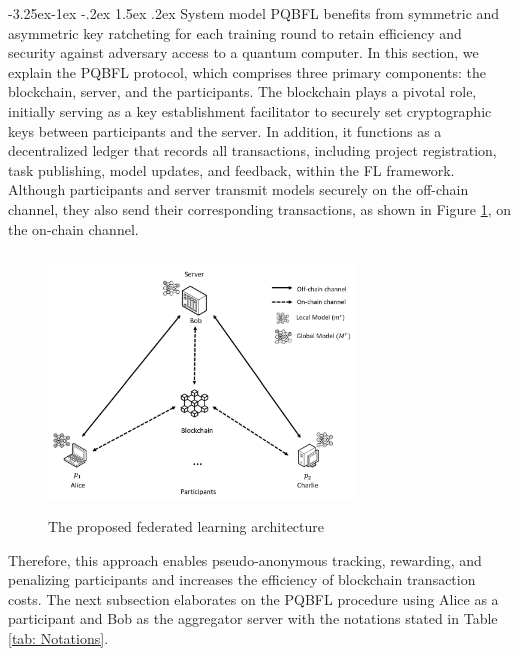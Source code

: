\documentclass[a4paper,fleqn]{cas-dc}
\makeatletter
\renewcommand\subsection{\@startsection{subsection}{2}{\z@}%
   {-3.25ex\@plus -1ex \@minus -.2ex}%
   {1.5ex \@plus .2ex}%
   {\normalfont\large}} %
\makeatother
\begin{document}
\subsection{System model}
PQBFL benefits from symmetric and asymmetric key ratcheting for each training round to retain efficiency and security against adversary access to a quantum computer.
In this section, we explain the PQBFL protocol, which comprises three primary components: the blockchain, server, and the participants. 
The blockchain plays a pivotal role, initially serving as a key establishment facilitator to securely set cryptographic keys between participants and the server.
In addition, it functions as a decentralized ledger that records all transactions, including project registration, task publishing, model updates, and feedback, within the FL framework.
Although participants and server transmit models securely on the off-chain channel, they also send their corresponding transactions, as shown in Figure \ref{fig:proposed FL architecture}, on the on-chain channel.
\begin{figure}[ht]
    \centering
\includegraphics[width=3.2in,height=2.7in]{Images/2.png}
    \caption{The proposed federated learning architecture}
    \label{fig:proposed FL architecture}
\end{figure}
Therefore, this approach enables pseudo-anonymous tracking, rewarding, and penalizing participants and increases the efficiency of blockchain transaction costs.
The next subsection elaborates on the PQBFL procedure using Alice as a participant and Bob as the aggregator server with the notations stated in Table \ref{tab: Notations}.


\end{document}
